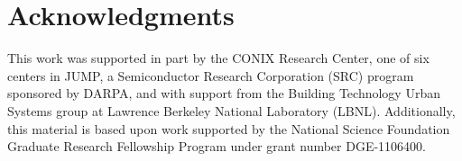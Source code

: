 \section{Acknowledgments}
\label{sec:ack}

This work was supported in part by the CONIX Research Center,
one of six centers in JUMP, a Semiconductor Research Corporation
(SRC) program sponsored by DARPA, and with support from the Building Technology
Urban Systems group at Lawrence
Berkeley National Laboratory (LBNL).
Additionally, this material is based upon work supported by the National
Science Foundation Graduate Research Fellowship Program under grant number
DGE-1106400.

